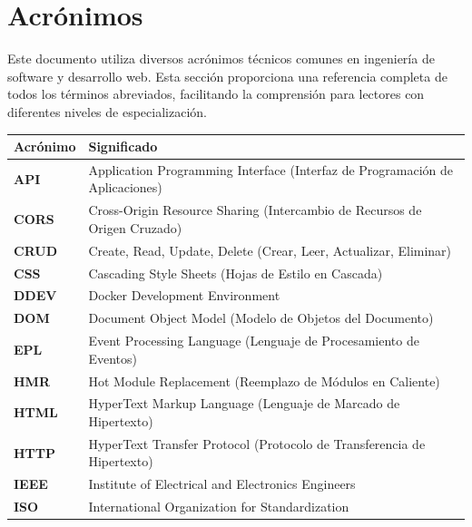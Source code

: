\documentclass[12pt,a4paper,oneside]{report}
\begin{document}
\section{Acrónimos}\label{acruxf3nimos}

Este documento utiliza diversos acrónimos técnicos comunes en ingeniería de software y desarrollo web. Esta sección proporciona una referencia completa de todos los términos abreviados, facilitando la comprensión para lectores con diferentes niveles de especialización.

\begin{longtable}[]{@{}
  >{\raggedright\arraybackslash}p{}
  >{\raggedright\arraybackslash}p{}@{}}
\toprule\noalign{}
\begin{minipage}[b]{\linewidth}\raggedright
Acrónimo
\end{minipage} & \begin{minipage}[b]{\linewidth}\raggedright
Significado
\end{minipage} \\
\midrule\noalign{}
\endhead
\bottomrule\noalign{}
\endlastfoot
\textbf{API} & Application Programming Interface (Interfaz de
Programación de Aplicaciones) \\
\textbf{CORS} & Cross-Origin Resource Sharing (Intercambio de Recursos
de Origen Cruzado) \\
\textbf{CRUD} & Create, Read, Update, Delete (Crear, Leer, Actualizar,
Eliminar) \\
\textbf{CSS} & Cascading Style Sheets (Hojas de Estilo en Cascada) \\
\textbf{DDEV} & Docker Development Environment \\
\textbf{DOM} & Document Object Model (Modelo de Objetos del
Documento) \\
\textbf{EPL} & Event Processing Language (Lenguaje de Procesamiento de
Eventos) \\
\textbf{HMR} & Hot Module Replacement (Reemplazo de Módulos en
Caliente) \\
\textbf{HTML} & HyperText Markup Language (Lenguaje de Marcado de
Hipertexto) \\
\textbf{HTTP} & HyperText Transfer Protocol (Protocolo de Transferencia
de Hipertexto) \\
\textbf{IEEE} & Institute of Electrical and Electronics Engineers \\
\textbf{ISO} & International Organization for Standardization \\

\end{longtable}
\end{document}
